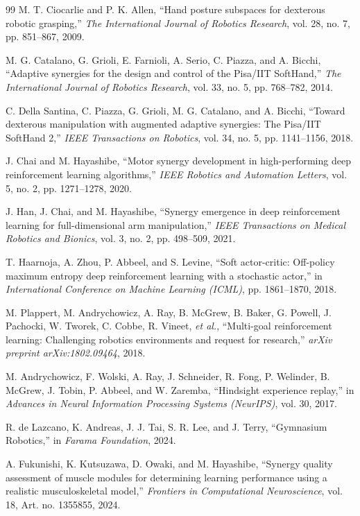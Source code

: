 \documentclass[letterpaper, 10 pt, conference]{ieeeconf}  %
\begin{document}
\begin{thebibliography}{99}
        M. T. Ciocarlie and P. K. Allen, ``Hand posture subspaces for dexterous robotic grasping,'' \emph{The International Journal of Robotics Research}, vol. 28, no. 7, pp. 851--867, 2009.

        M. G. Catalano, G. Grioli, E. Farnioli, A. Serio, C. Piazza, and A. Bicchi, ``Adaptive synergies for the design and control of the Pisa/IIT SoftHand,'' \emph{The International Journal of Robotics Research}, vol. 33, no. 5, pp. 768--782, 2014.

        C. Della Santina, C. Piazza, G. Grioli, M. G. Catalano, and A. Bicchi, ``Toward dexterous manipulation with augmented adaptive synergies: The Pisa/IIT SoftHand 2,'' \emph{IEEE Transactions on Robotics}, vol. 34, no. 5, pp. 1141--1156, 2018.

        J. Chai and M. Hayashibe, ``Motor synergy development in high-performing deep reinforcement learning algorithms,'' \emph{IEEE Robotics and Automation Letters}, vol. 5, no. 2, pp. 1271--1278, 2020.

        J. Han, J. Chai, and M. Hayashibe, ``Synergy emergence in deep reinforcement learning for full-dimensional arm manipulation,'' \emph{IEEE Transactions on Medical Robotics and Bionics}, vol. 3, no. 2, pp. 498--509, 2021.

        T. Haarnoja, A. Zhou, P. Abbeel, and S. Levine, ``Soft actor-critic: Off-policy maximum entropy deep reinforcement learning with a stochastic actor,'' in \emph{International Conference on Machine Learning (ICML)}, pp. 1861--1870, 2018.

        M. Plappert, M. Andrychowicz, A. Ray, B. McGrew, B. Baker, G. Powell, J. Pachocki, W. Tworek, C. Cobbe, R. Vineet, \emph{et al.}, ``Multi-goal reinforcement learning: Challenging robotics environments and request for research,'' \emph{arXiv preprint arXiv:1802.09464}, 2018.

        M. Andrychowicz, F. Wolski, A. Ray, J. Schneider, R. Fong, P. Welinder, B. McGrew, J. Tobin, P. Abbeel, and W. Zaremba, ``Hindsight experience replay,'' in \emph{Advances in Neural Information Processing Systems (NeurIPS)}, vol. 30, 2017.

        R. de Lazcano, K. Andreas, J. J. Tai, S. R. Lee, and J. Terry, ``Gymnasium Robotics,'' in \emph{Farama Foundation}, 2024. 

        A. Fukunishi, K. Kutsuzawa, D. Owaki, and M. Hayashibe, 
        ``Synergy quality assessment of muscle modules for determining 
        learning performance using a realistic musculoskeletal model,'' 
        \emph{Frontiers in Computational Neuroscience}, vol. 18, 
        Art. no. 1355855, 2024.


\end{thebibliography}
\end{document}
